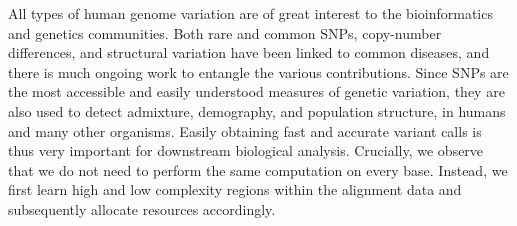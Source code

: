 \documentclass[12pt]{article}
\newcommand\TODO[1]{\textcolor{red}{TODO: #1}}
\begin{document}
All types of human genome variation are of great interest to the bioinformatics
and genetics communities.  Both rare and common SNPs, copy-number differences,
and structural variation have been linked to common diseases, and there is much
ongoing work to entangle the various contributions.  Since SNPs are the most
accessible and easily understood measures of genetic variation, they are also
used to detect admixture, demography, and population structure, in humans and
many other organisms.  Easily obtaining fast and accurate variant calls is thus
very important for downstream biological analysis.
Crucially, we observe that we do not need to perform the same computation on
every base.  Instead, we first learn high and low complexity regions within the
alignment data and subsequently allocate resources accordingly.





\end{document}
